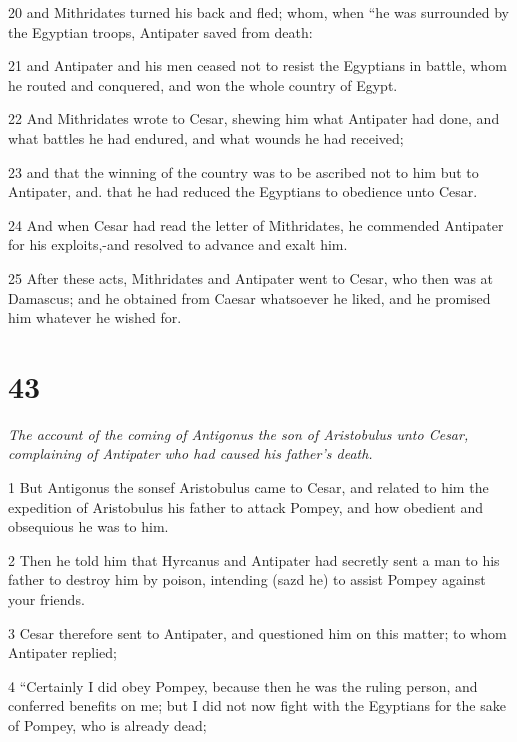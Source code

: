 \par 20 and Mithridates turned his back and fled; whom, when “he was surrounded by the Egyptian troops, Antipater saved from death: 

\par 21 and Antipater and his men ceased not to resist the Egyptians in battle, whom he routed and conquered, and won the whole country of Egypt. 

\par 22 And Mithridates wrote to Cesar, shewing him what Antipater had done, and what battles he had endured, and what wounds he had received; 

\par 23 and that the winning of the country was to be ascribed not to him but to Antipater, and. that he had reduced the Egyptians to obedience unto Cesar. 

\par 24 And when Cesar had read the letter of Mithridates, he commended Antipater for his exploits,-and resolved to advance and exalt him. 

\par 25 After these acts, Mithridates and Antipater went to Cesar, who then was at Damascus; and he obtained from Caesar whatsoever he liked, and he promised him whatever he wished for. 

\chapter{43}

\par \textit{The account of the coming of Antigonus the son of Aristobulus unto Cesar, complaining of Antipater who had caused his father’s death.}

\par 1 But Antigonus the sonsef Aristobulus came to Cesar, and related to him the expedition of Aristobulus his father to attack Pompey, and how obedient and obsequious he was to him. 

\par 2 Then he told him that Hyrcanus and Antipater had secretly sent a man to his father to destroy him by poison, intending (sazd he) to assist Pompey against your friends. 

\par 3 Cesar therefore sent to Antipater, and questioned him on this matter; to whom Antipater replied; 

\par 4 “Certainly I did obey Pompey, because then he was the ruling person, and conferred benefits on me; but I did not now fight with the Egyptians for the sake of Pompey, who is already dead; 

